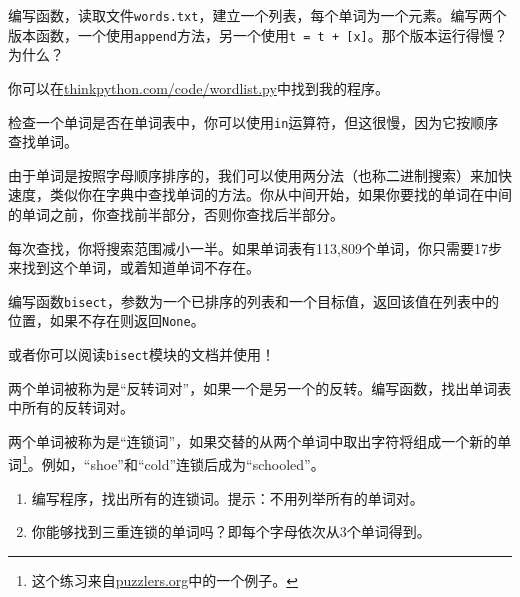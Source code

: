 \begin{ex}

编写函数，读取文件{\tt words.txt}，建立一个列表，每个单词为一个元素。编写两个版本函数，一个使用{\tt append}方法，另一个使用{\tt t = t + [x]}。那个版本运行得慢？为什么？

你可以在\url{thinkpython.com/code/wordlist.py}中找到我的程序。
\end{ex}


\begin{ex}
\label{单词表1}
\label{两分法}



检查一个单词是否在单词表中，你可以使用{\tt in}运算符，但这很慢，因为它按顺序查找单词。

由于单词是按照字母顺序排序的，我们可以使用两分法（也称二进制搜索）来加快速度，类似你在字典中查找单词的方法。你从中间开始，如果你要找的单词在中间的单词之前，你查找前半部分，否则你查找后半部分。

每次查找，你将搜索范围减小一半。如果单词表有113,809个单词，你只需要17步来找到这个单词，或着知道单词不存在。

编写函数{\tt bisect}，参数为一个已排序的列表和一个目标值，返回该值在列表中的位置，如果不存在则返回{\tt None}。


或者你可以阅读{\tt bisect}模块的文档并使用！
\end{ex}

\begin{ex}

两个单词被称为是“反转词对”，如果一个是另一个的反转。编写函数，找出单词表中所有的反转词对。
\end{ex}

\begin{ex}

两个单词被称为是“连锁词”，如果交替的从两个单词中取出字符将组成一个新的单词\footnote{这个练习来自\url{puzzlers.org}中的一个例子。}。例如，“shoe”和“cold”连锁后成为“schooled”。

\begin{enumerate}

\item 编写程序，找出所有的连锁词。提示：不用列举所有的单词对。

\item 你能够找到三重连锁的单词吗？即每个字母依次从3个单词得到。

\end{enumerate}
\end{ex}
